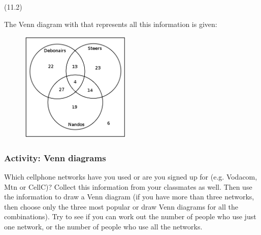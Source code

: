 {\begin{mdframed}[linewidth=4, leftmargin=40, rightmargin=40]
\begin{exercise}
\begin{enumerate}[noitemsep, label=\textbf{Step} \textbf{\arabic*}. ]
{\begin{minipage}{\columnwidth}
    \parbox[t]{48pt}{\raggedleft 
    (11.2)}
    \end{minipage}\vspace{12pt}\par
    }%
The Venn diagram with that represents all this information is given:
    \setcounter{subfigure}{0}
	\begin{figure}[H] %
    \begin{center}
    \label{m39377*id1106!!!underscore!!!media}\label{m39377*id1106!!!underscore!!!printimage}\includegraphics[width=200px]{col11306.imgs/m39377_Vennwex3.png} %
      \vspace{2pt}
    \vspace{.1in}
    \end{center}
 \end{figure}       
\end{enumerate}
    \end{exercise}
    \end{mdframed}
    }
    \noindent
\label{m39377*eip-796}
            \subsubsection{ Activity: Venn diagrams}
            \nopagebreak
            \label{m39377*eip-65}Which cellphone networks have you used or are you signed up for (e.g. Vodacom, Mtn or CellC)? Collect this information from your classmates as well. Then use the information to draw a Venn diagram (if you have more than three networks, then choose only the three most popular or draw Venn diagrams for all the combinations). Try to see if you can work out the number of people who use just one network, or the number of people who use all the networks.
\par \label{m39377*secfhsst!!!underscore!!!id3294}
